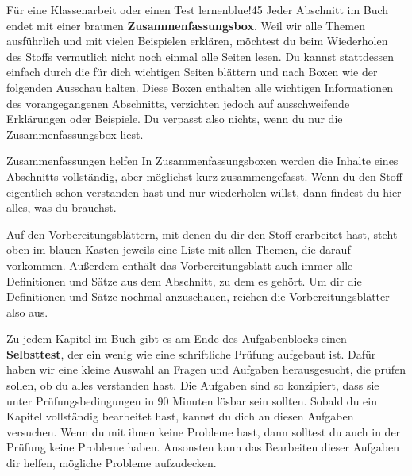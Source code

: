 \documentclass[../main.tex]{subfiles}
\begin{document}
\begin{goal}{Für eine Klassenarbeit oder einen Test lernen}{blue!45}
    Jeder Abschnitt im Buch endet mit einer braunen \textbf{Zusammenfassungsbox}. Weil wir alle Themen ausführlich und mit vielen Beispielen erklären, möchtest du beim Wiederholen des Stoffs vermutlich nicht noch einmal alle Seiten lesen. Du kannst stattdessen einfach durch die für dich wichtigen Seiten blättern und nach Boxen wie der folgenden Ausschau halten. Diese Boxen enthalten alle wichtigen Informationen des vorangegangenen Abschnitts, verzichten jedoch auf ausschweifende Erklärungen oder Beispiele. Du verpasst also nichts, wenn du nur die Zusammenfassungsbox liest.

    \begin{nutshell}{Zusammenfassungen helfen}
        In Zusammenfassungsboxen werden die Inhalte eines Abschnitts vollständig, aber möglichst kurz zusammengefasst. Wenn du den Stoff eigentlich schon verstanden hast und nur wiederholen willst, dann findest du hier alles, was du brauchst.
    \end{nutshell}

    Auf den Vorbereitungsblättern, mit denen du dir den Stoff erarbeitet hast, steht oben im blauen Kasten jeweils eine Liste mit allen Themen, die darauf vorkommen. Außerdem enthält das Vorbereitungsblatt auch immer alle Definitionen und Sätze aus dem Abschnitt, zu dem es gehört. Um dir die Definitionen und Sätze nochmal anzuschauen, reichen die Vorbereitungsblätter also aus.

    Zu jedem Kapitel im Buch gibt es am Ende des Aufgabenblocks einen \textbf{Selbsttest}, der ein wenig wie eine schriftliche Prüfung aufgebaut ist. Dafür haben wir eine kleine Auswahl an Fragen und Aufgaben herausgesucht, die prüfen sollen, ob du alles verstanden hast. Die Aufgaben sind so konzipiert, dass sie unter Prüfungsbedingungen in 90 Minuten lösbar sein sollten. Sobald du ein Kapitel vollständig bearbeitet hast, kannst du dich an diesen Aufgaben versuchen. Wenn du mit ihnen keine Probleme hast, dann solltest du auch in der Prüfung keine Probleme haben. Ansonsten kann das Bearbeiten dieser Aufgaben dir helfen, mögliche Probleme aufzudecken.


\end{goal}
\end{document}
